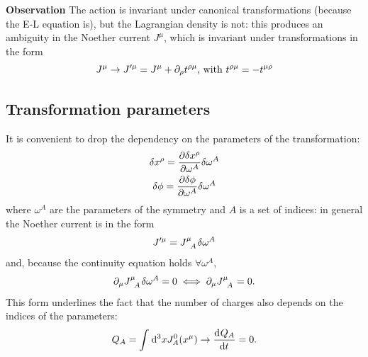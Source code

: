 \textbf{Observation} The action is invariant under canonical transformations
(because the E-L equation is), but the Lagrangian density is not: this produces
an ambiguity in the Noether current $J^\mu$, which is invariant under transformations
in the form
$$J^\mu\rightarrow J'^\mu = J^\mu + \pd_\rho t\indices{^\rho^\mu}\text{, with }
t^{\rho\mu} = - t^{\mu\rho}$$
\subsection{Transformation parameters}
It is convenient to drop the dependency on the parameters of the transformation:
\begin{gather*}
\delta x^\rho = \pdv{\delta x^\rho}{\omega^A}\delta\omega^A\\
\delta \phi = \pdv{\delta\phi}{\omega^A}\delta\omega^A
\end{gather*}
where $\omega^A$ are the parameters of the symmetry and $A$ is a set of indices:
in general the Noether current is in the form 
$$J'^\mu = J\indices{^\mu_A}\delta\omega^A$$
and, because the continuity equation holds $\forall \omega^A$,
$$\pd_\mu J\indices{^\mu_A}\delta \omega^A=0
\iff \pd_\mu J\indices{^\mu_A} = 0.$$
This form underlines the fact that the number of charges also depends on the indices of
the parameters:
$$Q_A = \int_{}^{}\dd^3 x J^0_A(x^\mu) \rightarrow \dv[]{Q_A}{t} = 0.$$
